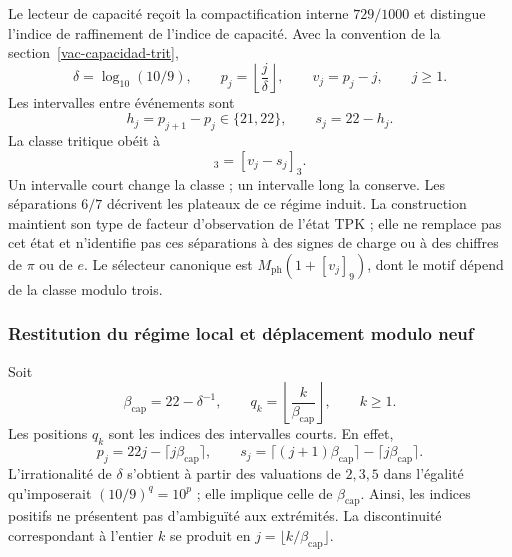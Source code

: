 Le lecteur de capacité reçoit la compactification interne $729/1000$ et
distingue l’indice de raffinement de l’indice de capacité. Avec la
convention de la section~\ref{vac-capacidad-trit},
\begin{equation}
 \delta=\log_{10}(10/9),\qquad
 p_j=\left\lfloor\frac{j}{\delta}\right\rfloor,\qquad
 v_j=p_j-j,\qquad j\geq1.
 \label{md:restop:capacidad}
\end{equation}
Les intervalles entre événements sont
\begin{equation}
 h_j=p_{j+1}-p_j\in\{21,22\},\qquad
 s_j=22-h_j.
 \label{md:restop:intervalos}
\end{equation}
La classe tritique obéit à
\begin{equation}
 [v_{j+1}]_3=[v_j-s_j]_3.
 \label{md:restop:clase-tritica}
\end{equation}
Un intervalle court change la classe ; un intervalle long la conserve.
Les séparations $6/7$ décrivent les plateaux de ce régime induit.
La construction maintient son type de facteur d’observation de l’état TPK ;
elle ne remplace pas cet état et n’identifie pas ces séparations à des signes de
charge ou à des chiffres de $\pi$ ou de $e$.
Le sélecteur canonique est
$M_{\mathrm{ph}}(1+[v_j]_9)$, dont le motif dépend de la classe modulo trois.

\subsubsection{Restitution du régime local et déplacement modulo neuf}
\label{md:restop:consecuencia-capacidad}

Soit
\begin{equation}
 \beta_{\mathrm{cap}}=22-\delta^{-1},\qquad
 q_k=\left\lfloor\frac{k}{\beta_{\mathrm{cap}}}\right\rfloor,\qquad k\geq1.
 \label{md:restop:pendiente-inducida}
\end{equation}
Les positions $q_k$ sont les indices des intervalles courts. En effet,
\begin{equation}
 p_j=22j-\lceil j\beta_{\mathrm{cap}}\rceil,\qquad
 s_j=\lceil(j+1)\beta_{\mathrm{cap}}\rceil
     -\lceil j\beta_{\mathrm{cap}}\rceil.
 \label{md:restop:eventos-cortos}
\end{equation}
L’irrationalité de $\delta$ s’obtient à partir des valuations de $2,3,5$
dans l’égalité qu’imposerait $(10/9)^q=10^p$ ; elle implique celle de
$\beta_{\mathrm{cap}}$. Ainsi, les indices positifs ne présentent pas
d’ambiguïté aux extrémités. La discontinuité correspondant à l’entier $k$
se produit en $j=\lfloor k/\beta_{\mathrm{cap}}\rfloor$.

